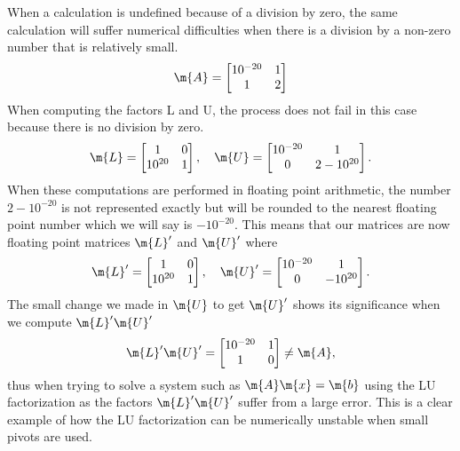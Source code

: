 \begin{example}
  When a calculation is undefined because of a division by zero, the same calculation will suffer numerical difficulties when there is a division by a non-zero number that is relatively small.
  \begin{equation*}
    \m{A} = \begin{bmatrix}
      10^{-20} & 1 \\
      1 & 2
    \end{bmatrix}
  \end{equation*}
  When computing the factors L and U, the process does not fail in this case because there is no division by zero.
  \begin{equation*}
    \m{L} = \begin{bmatrix}
      1 & 0 \\
      10^{20} & 1
    \end{bmatrix}, \quad \m{U} = \begin{bmatrix}
      10^{-20} & 1 \\
      0 & 2 - 10^{20}
    \end{bmatrix}.
  \end{equation*}
  When these computations are performed in floating point arithmetic, the number $2 - 10^{-20}$ is not represented exactly but will be rounded to the nearest floating point number which we will say is $-10^{-20}$. This means that our matrices are now floating point matrices $\m{L}^\prime$ and $\m{U}^\prime$ where
  \begin{equation*}
    \m{L}^\prime = \begin{bmatrix}
      1 & 0 \\
      10^{20} & 1
    \end{bmatrix}, \quad \m{U}^\prime = \begin{bmatrix}
      10^{-20} & 1 \\
      0 & -10^{20}
    \end{bmatrix}.
  \end{equation*}
  The small change we made in $\m{U}$ to get $\m{U}^\prime$ shows its significance when we compute $\m{L}^\prime\m{U}^\prime$
  \begin{equation*}
    \m{L}^\prime\m{U}^\prime = \begin{bmatrix}
      10^{-20} & 1 \\
      1 & 0
    \end{bmatrix} \neq \m{A},
  \end{equation*}
  thus when trying to solve a system such as $\m{A}\m{x} = \m{b}$ using the \ac{LU} factorization as the factors $\m{L}^\prime\m{U}^\prime$ suffer from a large error. This is a clear example of how the \ac{LU} factorization can be numerically unstable when small pivots are used.
\end{example}

